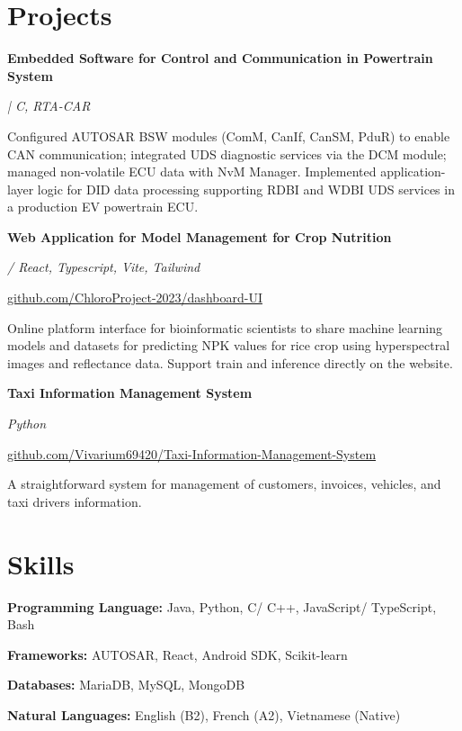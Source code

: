 \documentclass[10pt,a4paper]{article}
\begin{document}
\section*{ Projects }


\textbf{ Embedded Software for Control and Communication in Powertrain System }

\textit{ | C, RTA-CAR }


Configured AUTOSAR BSW modules (ComM, CanIf, CanSM, PduR) to enable CAN communication; integrated UDS diagnostic services via the DCM module; managed non-volatile ECU data with NvM Manager. Implemented application-layer logic for DID data processing supporting RDBI and WDBI UDS services in a production EV powertrain ECU.

\vspace{4pt}


\textbf{ Web Application for Model Management for Crop Nutrition }

\textit{ / React, Typescript, Vite, Tailwind }

\href{https://github.com/ChloroProject-2023/dashboard-UI}{ github.com/ChloroProject-2023/dashboard-UI }

Online platform interface for bioinformatic scientists to share machine learning models and datasets for predicting NPK values for rice crop using hyperspectral images and reflectance data. Support train and inference directly on the website.

\vspace{4pt}


\textbf{ Taxi Information Management System }

\textit{ Python }

\href{https://github.com/Vivarium69420/Taxi-Information-Management-System}{ github.com/Vivarium69420/Taxi-Information-Management-System }

A straightforward system for management of customers, invoices, vehicles, and taxi drivers information.

\vspace{4pt}



\section*{ Skills }


\textbf{ Programming Language: }
Java, Python, C/ C++, JavaScript/ TypeScript, Bash

\vspace{2pt}


\textbf{ Frameworks: }
AUTOSAR, React, Android SDK, Scikit-learn

\vspace{2pt}


\textbf{ Databases: }
MariaDB, MySQL, MongoDB

\vspace{2pt}


\textbf{ Natural Languages: }
English (B2), French (A2), Vietnamese (Native)

\vspace{2pt}
\end{document}

